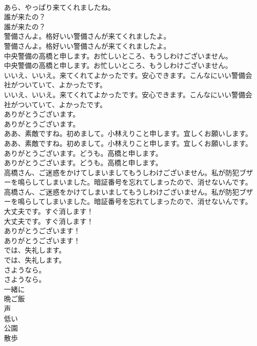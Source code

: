 \documentclass[8pt]{extreport}
\begin{document}
\begin{CJK}{UTF8}{min}
\\	あら、やっぱり来てくれましたね。 
\\	誰が来たの？	
\\	誰が来たの？ 
\\	警備さんよ。格好いい警備さんが来てくれましたよ。	
\\	警備さんよ。格好いい警備さんが来てくれましたよ。 
\\	中央警備の高橋と申します。お忙しいところ、もうしわけございません。	
\\	中央警備の高橋と申します。お忙しいところ、もうしわけございません。 
\\	いいえ、いいえ。来てくれてよかったです。安心できます。こんなにいい警備会社がついていて、よかったです。	
\\	いいえ、いいえ。来てくれてよかったです。安心できます。こんなにいい警備会社がついていて、よかったです。 
\\	ありがとうございます。	
\\	ありがとうございます。 
\\	ああ、素敵ですね。初めまして。小林えりこと申します。宜しくお願いします。	
\\	ああ、素敵ですね。初めまして。小林えりこと申します。宜しくお願いします。 
\\	ありがとうございます。どうも。高橋と申します。	
\\	ありがとうございます。どうも。高橋と申します。 
\\	高橋さん、ご迷惑をかけてしまいましてもうしわけございません。私が防犯ブザーを鳴らしてしまいました。暗証番号を忘れてしまったので、消せないんです。	
\\	高橋さん、ご迷惑をかけてしまいましてもうしわけございません。私が防犯ブザーを鳴らしてしまいました。暗証番号を忘れてしまったので、消せないんです。 
\\	大丈夫です。すぐ消します！	
\\	大丈夫です。すぐ消します！ 
\\	ありがとうございます！	
\\	ありがとうございます！ 
\\	では、失礼します。	
\\	では、失礼します。 
\\	さようなら。	
\\	さようなら。 
\\	一緒に
\\	晩ご飯
\\	声
\\	低い
\\	公園
\\	散歩

\end{CJK}
\end{document}
